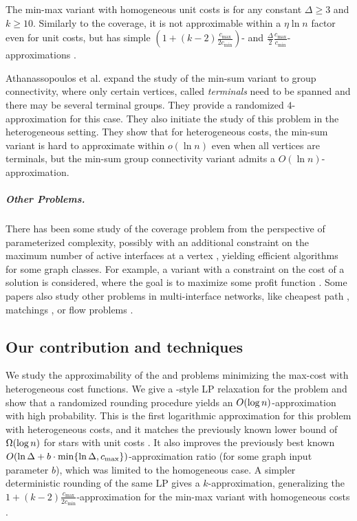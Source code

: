 The min-max variant with homogeneous unit costs is \NPhard for any constant $\Delta \geq 3$ and $k \geq 10$. Similarly to the coverage, it is not approximable within a $\eta \ln n$ factor even for unit costs, but has simple $(1+(k-2) \frac{c_{\max}}{2 c_{\min}})$- and $\frac{\Delta}{2} \frac{c_{\max}}{c_{\min}}$-approximations \cite{MinimizeTheMaximumDutyInMultiInterfaceNetworks}.

Athanassopoulos et al. \cite{EnergyEfficientCommunicationInMultiInterfaceWirelessNetworks} expand the study of the min-sum variant to group connectivity, where only certain vertices, called \textit{terminals} need to be spanned and there may be several terminal groups. They provide a randomized $4$-approximation for this case. They also initiate the study of this problem in the heterogeneous setting. They show that for heterogeneous costs, the min-sum variant is hard to approximate within $o(\ln n)$ even when all vertices are terminals, but the min-sum group connectivity variant admits a $O(\ln n)$-approximation.

\subparagraph*{Other Problems.} There has been some  study of the coverage problem from the perspective of parameterized complexity, possibly with an additional constraint on the maximum number of active interfaces at a vertex \cite{MinMaxCoverageInMultiInterfaceNetworksPathwidth,OnComputationalComplexityOfCoveringMultiInterfaceNetworks,SurveyOfCoverageProblemsinMultiInterfaceWirelessNetworks}, yielding efficient algorithms for some graph classes. For example, a variant with a constraint on the cost of a solution is considered, where the goal is to maximize some profit function \cite{SurveyOfCoverageProblemsinMultiInterfaceWirelessNetworks}. Some papers also study other problems in multi-interface networks, like cheapest path \cite{ExploitingMultiInterfaceNetworksConnectivityAndCheapestPaths}, matchings \cite{MaximumMatchingInMultiInterfaceNetworks}, or flow problems \cite{FlowProblemsInMultiInterfaceNetworks}.

\subsection{Our contribution and techniques}

We study the approximability of the \coverage and \connectivity problems minimizing the max-cost with heterogeneous cost functions. We give a \setcover-style LP relaxation for the \coverage problem and show that a randomized rounding procedure yields an $O\mathopen{}\left( \log n \right)$-approximation with high probability. This is the first logarithmic approximation for this problem with heterogeneous costs, and it matches the previously known lower bound of $\Omega\mathopen{}\left( \log n \right)$ for stars with unit costs \cite{MinimizeTheMaximumDutyInMultiInterfaceNetworks}. It also improves the previously best known $O\mathopen{}\left( \ln \Delta + b \cdot \min\mathopen{}\left\{ \ln \Delta, c_{\max} \right\} \right)$-approximation ratio \cite{MinimizeTheMaximumDutyInMultiInterfaceNetworks} (for some graph input parameter $b$), which was limited to the homogeneous case. 
A simpler deterministic rounding of the same LP gives a $k$-approximation, generalizing the $1+(k-2) \frac{c_{\max}}{2 c_{\min}}$-approximation for the min-max variant with homogeneous costs \cite{MinimizeTheMaximumDutyInMultiInterfaceNetworks}.

